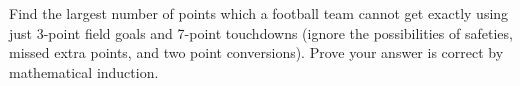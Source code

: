 \begin{questions}
%  
%    
%    


\question Find the largest number of points which a football team cannot get exactly using just 3-point field goals and 7-point touchdowns (ignore the possibilities of safeties, missed extra points, and two point conversions).  Prove your answer is correct by mathematical induction.


\end{questions}
